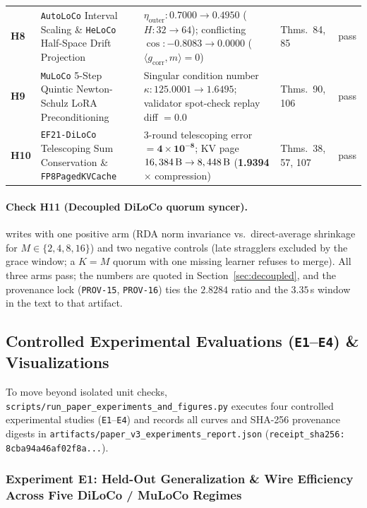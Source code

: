 \documentclass[11pt,a4paper]{article}
\begin{document}
\begin{table}[htbp!]
{\begin{tabular}{@{}llp{6.6cm}lc@{}}
\textbf{H8} & \texttt{AutoLoCo} Interval Scaling \& \texttt{HeLoCo} Half-Space Drift Projection & $\eta_{\text{outer}}: 0.7000 \to 0.4950$ ($H: 32 \to 64$); conflicting $\cos: -0.8083 \to 0.0000$ ($\langle g_{\text{corr}}, m \rangle = 0$) & Thms.\ 84, 85 & pass \\
\textbf{H9} & \texttt{MuLoCo} 5-Step Quintic Newton-Schulz LoRA Preconditioning & Singular condition number $\kappa: 125.0001 \to \mathbf{1.6495}$; validator spot-check replay diff $= \mathbf{0.0}$ & Thms.\ 90, 106 & pass \\
\textbf{H10} & \texttt{EF21-DiLoCo} Telescoping Sum Conservation \& \texttt{FP8PagedKVCache} & 3-round telescoping error $= \mathbf{4 \times 10^{-8}}$; KV page $16,384\text{\,B} \to 8,448\text{\,B}$ (\textbf{1.9394$\times$} compression) & Thms.\ 38, 57, 107 & pass \\
\bottomrule
\end{tabular}%
}
\end{table}

\paragraph{Check H11 (Decoupled DiLoCo quorum syncer).}  writes  with one positive arm (RDA norm invariance vs.\ direct-average shrinkage for $M \in \{2,4,8,16\}$) and two negative controls (late stragglers excluded by the grace window; a $K=M$ quorum with one missing learner refuses to merge). All three arms pass; the numbers are quoted in Section~\ref{sec:decoupled}, and the provenance lock (\texttt{PROV-15}, \texttt{PROV-16}) ties the $2.8284$ ratio and the $3.35$\,s window in the text to that artifact.

\subsection{Controlled Experimental Evaluations (\texttt{E1}--\texttt{E4}) \& Visualizations}

To move beyond isolated unit checks, \texttt{scripts/run\_paper\_experiments\_and\_figures.py} executes four controlled experimental studies (\texttt{E1}--\texttt{E4}) and records all curves and SHA-256 provenance digests in \texttt{artifacts/paper\_v3\_experiments\_report.json} (\texttt{receipt\_sha256: 8cba94a46af02f8a...}).

\subsubsection{Experiment E1: Held-Out Generalization \& Wire Efficiency Across Five DiLoCo / MuLoCo Regimes}
\end{document}

